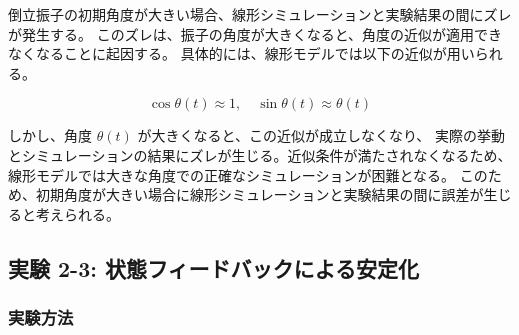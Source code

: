倒立振子の初期角度が大きい場合、線形シミュレーションと実験結果の間にズレが発生する。
このズレは、振子の角度が大きくなると、角度の近似が適用できなくなることに起因する。
具体的には、線形モデルでは以下の近似が用いられる。

\[
  \cos \theta(t) \approx 1, \quad \sin \theta(t) \approx \theta(t)
\]

しかし、角度 \( \theta(t) \) が大きくなると、この近似が成立しなくなり、
実際の挙動とシミュレーションの結果にズレが生じる。近似条件が満たされなくなるため、
線形モデルでは大きな角度での正確なシミュレーションが困難となる。
このため、初期角度が大きい場合に線形シミュレーションと実験結果の間に誤差が生じると考えられる。


\subsection{実験 2-3: 状態フィードバックによる安定化}
\subsubsection{実験方法}

